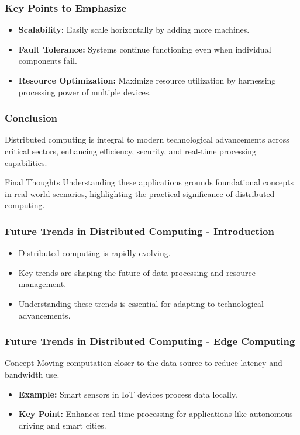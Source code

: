 \documentclass[aspectratio=169]{beamer}
\begin{document}
\begin{frame}[fragile]
    \frametitle{Key Points to Emphasize}
    \begin{itemize}
        \item \textbf{Scalability:} Easily scale horizontally by adding more machines.
        \item \textbf{Fault Tolerance:} Systems continue functioning even when individual components fail.
        \item \textbf{Resource Optimization:} Maximize resource utilization by harnessing processing power of multiple devices.
    \end{itemize}
\end{frame}

\begin{frame}[fragile]
    \frametitle{Conclusion}
    Distributed computing is integral to modern technological advancements across critical sectors, enhancing efficiency, security, and real-time processing capabilities.
    \begin{block}{Final Thoughts}
        Understanding these applications grounds foundational concepts in real-world scenarios, highlighting the practical significance of distributed computing.
    \end{block}
\end{frame}

\begin{frame}[fragile]
    \frametitle{Future Trends in Distributed Computing - Introduction}
    \begin{itemize}
        \item Distributed computing is rapidly evolving.
        \item Key trends are shaping the future of data processing and resource management.
        \item Understanding these trends is essential for adapting to technological advancements.
    \end{itemize}
\end{frame}

\begin{frame}[fragile]
    \frametitle{Future Trends in Distributed Computing - Edge Computing}
    \begin{block}{Concept}
        Moving computation closer to the data source to reduce latency and bandwidth use.
    \end{block}
    \begin{itemize}
        \item \textbf{Example:} Smart sensors in IoT devices process data locally.
        \item \textbf{Key Point:} Enhances real-time processing for applications like autonomous driving and smart cities.
    \end{itemize}
\end{frame}
\end{document}
